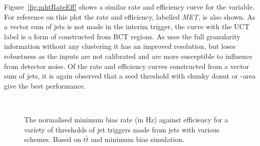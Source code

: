 Figure~\ref{fig:mhtRateEff} shows a similar rate and efficiency curve
for the \MHT variable. For reference on this plot the \MET rate and
efficiency, labelled \emph{MET}, is also shown. As a
vector sum of jets is not made in the interim trigger, the curve with
the UCT label is a form of \MET constructed from \ac{RCT} regions. As \MET
uses the full granularity \TT information without any clustering it
has an improved resolution, but loses robustness as the inputs are not
calibrated and are more susceptible to influence from detector noise.
Of the rate and efficiency curves constructed from a vector sum of
jets, it is again observed that a seed threshold with chunky donut or
\rho-area \PUS give the best performance.

\begin{figure}
  \centering
  ~ 
  \caption{ The normalised minimum bias rate (in Hz) against efficiency for a
  variety of thresholds of jet triggers
  made from jets with various \PUS schemes. Based on $t\bar{t}$ and
  minimum bias \MC simulation.}
  \label{fig:rateEffJet}
\end{figure}

